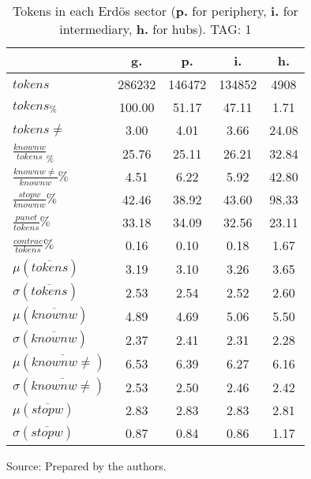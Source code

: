 \begin{table}[h!]
\begin{center}
	\caption{Tokens in each Erd\"os sector ({{\bf p.}} for periphery, {{\bf i.}} for intermediary, {{\bf h.}} for hubs). TAG: 1}\label{tab:tokensInline}
	\def\arraystretch{1.5}
\begin{tabular}{| l || c | c | c | c |}\hline
 & {\bf g.} & {\bf p.} & {\bf i.} & {\bf h.} \\\hline\hline
$tokens$ & 286232  & 146472  & 134852  & 4908 \\
$tokens_{\%}$ & 100.00  & 51.17  & 47.11  & 1.71 \\
$tokens \neq$ & 3.00  & 4.01  & 3.66  & 24.08 \\\hline
$\frac{knownw}{tokens}_\%$ & 25.76  & 25.11  & 26.21  & 32.84 \\
$\frac{knownw \neq}{knownw}\%$ & 4.51  & 6.22  & 5.92  & 42.80 \\\hline
$\frac{stopw}{knownw}\%$ & 42.46  & 38.92  & 43.60  & 98.33 \\
$\frac{punct}{tokens}\%$ & 33.18  & 34.09  & 32.56  & 23.11 \\
$\frac{contrac}{tokens}\%$ & 0.16  & 0.10  & 0.18  & 1.67 \\\hline\hline
$\mu(\overline{tokens})$ & 3.19  & 3.10  & 3.26  & 3.65 \\
$\sigma(\overline{tokens})$ & 2.53  & 2.54  & 2.52  & 2.60 \\\hline
$\mu(\overline{knownw})$ & 4.89  & 4.69  & 5.06  & 5.50 \\
$\sigma(\overline{knownw})$ & 2.37  & 2.41  & 2.31  & 2.28 \\\hline
$\mu(\overline{knownw \neq})$ & 6.53  & 6.39  & 6.27  & 6.16 \\
$\sigma(\overline{knownw \neq})$ & 2.53  & 2.50  & 2.46  & 2.42 \\\hline
$\mu(\overline{stopw})$ & 2.83  & 2.83  & 2.83  & 2.81 \\
$\sigma(\overline{stopw})$ & 0.87  & 0.84  & 0.86  & 1.17 \\\hline
\end{tabular}
\begin{flushleft}
		Source: Prepared by the authors.\
\end{flushleft}
\end{center}
\end{table}
